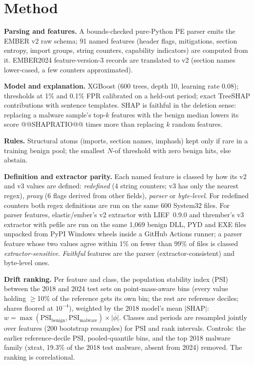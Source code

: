 \documentclass[10pt]{article}
\begin{document}
\section{Method}
\textbf{Parsing and features.} A bounds-checked pure-Python PE parser emits the EMBER v2 raw schema;
91 named features (header flags, mitigations, section entropy, import groups, string counters,
capability indicators) are computed from it. EMBER2024 feature-version-3 records are translated to v2
(section names lower-cased, a few counters approximated).

\textbf{Model and explanation.} XGBoost (600 trees, depth 10, learning rate 0.08); thresholds at 1\%
and 0.1\% FPR calibrated on a held-out period; exact TreeSHAP contributions with sentence templates.
SHAP is faithful in the deletion sense: replacing a malware sample's top-$k$ features with the benign
median lowers its score @@SHAPRATIO@@ times more than replacing $k$ random features.

\textbf{Rules.} Structural atoms (imports, section names, imphash) kept only if rare in a training
benign pool; the smallest $N$-of threshold with zero benign hits, else abstain.

\textbf{Definition and extractor parity.} Each named feature is classed by how its v2 and v3 values are
defined: \emph{redefined} (4 string counters; v3 has only the nearest regex), \emph{proxy} (6 flags
derived from other fields), \emph{parser} or \emph{byte-level}. For redefined counters both regex
definitions are run on the same 600 System32 files. For parser features, elastic/ember's v2 extractor
with LIEF~0.9.0 and thrember's v3 extractor with pefile are run on the same 1{,}069 benign DLL, PYD and
EXE files unpacked from PyPI Windows wheels inside a GitHub Actions runner; a parser feature whose two
values agree within 1\% on fewer than 99\% of files is classed \emph{extractor-sensitive}.
\emph{Faithful} features are the parser (extractor-consistent) and byte-level ones.

\textbf{Drift ranking.} Per feature and class, the population stability index (PSI) between the 2018
and 2024 test sets on point-mass-aware bins (every value holding $\ge$10\% of the reference gets its
own bin; the rest are reference deciles; shares floored at $10^{-4}$), weighted by the 2018 model's
mean $|$SHAP$|$: $w = \max(\mathrm{PSI}_\mathrm{benign}, \mathrm{PSI}_\mathrm{malware}) \times
\overline{|\phi|}$. Classes and periods are resampled jointly over features (200 bootstrap resamples)
for PSI and rank intervals. Controls: the earlier reference-decile PSI, pooled-quantile bins, and the
top 2018 malware family (xtrat, 19.3\% of the 2018 test malware, absent from 2024) removed. The
ranking is correlational.
\end{document}
